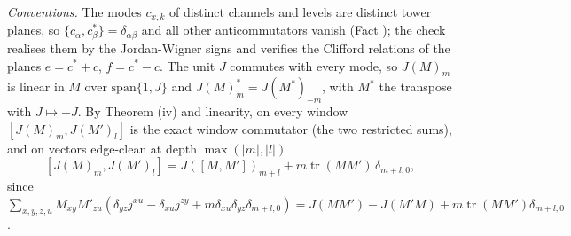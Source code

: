 \emph{Conventions.} The modes $c_{x,k}$ of distinct channels and levels are distinct tower planes, so $\{c_{\alpha}, c^{*}_{\beta}\} = \delta_{\alpha\beta}$ and all other anticommutators vanish (Fact ); the check realises them by the Jordan-Wigner signs and verifies the Clifford relations of the planes $e = c^{*} + c$, $f = c^{*} - c$. The unit $J$ commutes with every mode, so $J(M)_{m}$ is linear in $M$ over $\mathrm{span}\{1, J\}$ and $J(M)_{m}^{*} = J(M^{*})_{-m}$, with $M^{*}$ the transpose with $J \mapsto -J$. By Theorem (iv) and linearity, on every window $[J(M)_{m}, J(M')_{l}]$ is the exact window commutator (the two restricted sums), and on vectors edge-clean at depth $\max(|m|, |l|)$
\[
[J(M)_{m}, J(M')_{l}] = J([M, M'])_{m+l} + m\operatorname{tr}(MM')\,\delta_{m+l,0}, \tag{1}
\]
since $\sum_{x,y,z,u}M_{xy}M'_{zu}(\delta_{yz}j^{xu} - \delta_{xu}j^{zy} + m\delta_{xu}\delta_{yz}\delta_{m+l,0}) = J(MM') - J(M'M) + m\operatorname{tr}(MM')\delta_{m+l,0}$.


